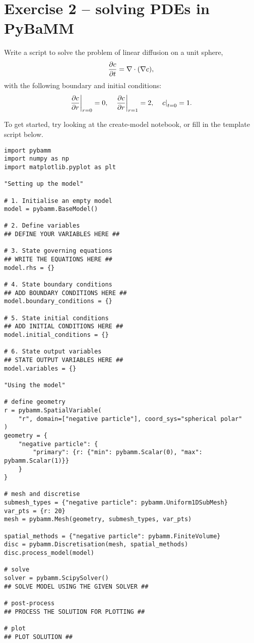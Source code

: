 \documentclass[a4paper,11pt]{article}
\begin{document}
\pagebreak
\section*{Exercise 2 -- solving PDEs in PyBaMM}
Write a script to solve the problem of linear diffusion on a unit sphere,
\begin{equation*}
  \pdv{c}{t} = \nabla \cdot (\nabla c),
\end{equation*}
with the following boundary and initial conditions:
\begin{equation*}
  \left.\pdv{c}{r}\right\vert_{r=0} = 0, \quad \left.\pdv{c}{r}\right\vert_{r=1} = 2, \quad \left.c\right\vert_{t=0} = 1.
\end{equation*}

To get started, try looking at the create-model notebook, or fill in the template script below.

\begin{lstlisting}[label={Ex2},caption=Solving PDEs script]
import pybamm
import numpy as np
import matplotlib.pyplot as plt

"Setting up the model"

# 1. Initialise an empty model
model = pybamm.BaseModel()

# 2. Define variables
## DEFINE YOUR VARIABLES HERE ##

# 3. State governing equations
## WRITE THE EQUATIONS HERE ##
model.rhs = {}

# 4. State boundary conditions
## ADD BOUNDARY CONDITIONS HERE ##
model.boundary_conditions = {}

# 5. State initial conditions
## ADD INITIAL CONDITIONS HERE ##
model.initial_conditions = {}

# 6. State output variables
## STATE OUTPUT VARIABLES HERE ##
model.variables = {}

"Using the model"

# define geometry
r = pybamm.SpatialVariable(
    "r", domain=["negative particle"], coord_sys="spherical polar"
)
geometry = {
    "negative particle": {
        "primary": {r: {"min": pybamm.Scalar(0), "max": pybamm.Scalar(1)}}
    }
}

# mesh and discretise
submesh_types = {"negative particle": pybamm.Uniform1DSubMesh}
var_pts = {r: 20}
mesh = pybamm.Mesh(geometry, submesh_types, var_pts)

spatial_methods = {"negative particle": pybamm.FiniteVolume}
disc = pybamm.Discretisation(mesh, spatial_methods)
disc.process_model(model)

# solve
solver = pybamm.ScipySolver()
## SOLVE MODEL USING THE GIVEN SOLVER ##

# post-process
## PROCESS THE SOLUTION FOR PLOTTING ##

# plot
## PLOT SOLUTION ##
\end{lstlisting}
\end{document}
